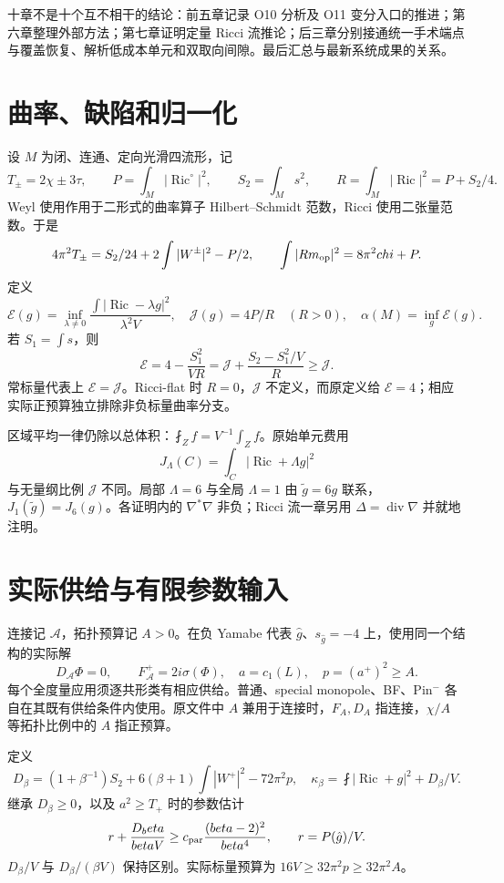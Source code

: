 \documentclass[UTF8,11pt,openany,oneside,fontset=none]{ctexbook}
\begin{document}
十章不是十个互不相干的结论：前五章记录 O10 分析及 O11 变分入口的推进；第六章整理外部方法；第七章证明定量 Ricci 流推论；后三章分别接通统一手术端点与覆盖恢复、解析低成本单元和双取向间隙。最后汇总与最新系统成果的关系。

\section{曲率、缺陷和归一化}\label{ch0:ux66f2ux7387ux7f3aux9677ux548cux5f52ux4e00ux5316}

设 \(M\) 为闭、连通、定向光滑四流形，记 \[
T_\pm=2\chi\pm3\tau,\qquad
P=\int_M|\operatorname{Ric}^{\circ}|^2,\qquad
S_2=\int_Ms^2,\qquad R=\int_M|\operatorname{Ric}|^2=P+S_2/4.
\] Weyl 使用作用于二形式的曲率算子 Hilbert--Schmidt 范数，Ricci 使用二张量范数。于是 \[
4\pi^2T_\pm=S_2/24+2\int|W^\pm|^2-P/2,
\qquad\int|\operatorname{Rm}_{\rm op}|^2=8\pi^2\chi+P.
\] 定义 \[
\mathcal E(g)=\inf_{\lambda\ne0}
\frac{\int|\operatorname{Ric}-\lambda g|^2}{\lambda^2V},
\quad\mathcal J(g)=4P/R\quad(R>0),\quad
\alpha(M)=\inf_g\mathcal E(g).
\] 若 \(S_1=\int s\)，则 \[
\mathcal E=4-\frac{S_1^2}{VR}
=\mathcal J+\frac{S_2-S_1^2/V}{R}\ge\mathcal J.
\] 常标量代表上 \(\mathcal E=\mathcal J\)。Ricci-flat 时 \(R=0\)，\(\mathcal J\) 不定义，而原定义给 \(\mathcal E=4\)；相应实际正预算独立排除非负标量曲率分支。

区域平均一律仍除以总体积：\(\fint_Z f=V^{-1}\int_Zf\)。原始单元费用 \[
J_\Lambda(C)=\int_C|\operatorname{Ric}+\Lambda g|^2
\] 与无量纲比例 \(\mathcal J\) 不同。局部 \(\Lambda=6\) 与全局 \(\Lambda=1\) 由 \(\widetilde g=6g\) 联系，\(J_1(\widetilde g)=J_6(g)\)。各证明内的 \(\nabla^*\nabla\) 非负；Ricci 流一章另用 \(\Delta=\operatorname{div}\nabla\) 并就地注明。

\section{实际供给与有限参数输入}\label{ch0:ux5b9eux9645ux4f9bux7ed9ux4e0eux6709ux9650ux53c2ux6570ux8f93ux5165}

连接记 \(\mathcal A\)，拓扑预算记 \(A>0\)。在负 Yamabe 代表 \(\hat g\)、\(s_{\hat g}=-4\) 上，使用同一个结构的实际解 \[
D_{\mathcal A}\Phi=0,\qquad F_{\mathcal A}^+=2i\sigma(\Phi),
\quad a=c_1(L),\quad p=(a^+)^2\ge A.
\] 每个全度量应用须逐共形类有相应供给。普通、special monopole、BF、Pin\(^-\) 各自在其既有供给条件内使用。原文件中 \(A\) 兼用于连接时，\(F_A,D_A\) 指连接，\(\chi/A\) 等拓扑比例中的 \(A\) 指正预算。\cite{Base,N1}

定义 \[
D_\beta=(1+\beta^{-1})S_2+6(\beta+1)\int|W^+|^2-72\pi^2p,
\quad\kappa_\beta=\fint|\operatorname{Ric}+g|^2+D_\beta/V.
\] 继承 \(D_\beta\ge0\)，以及 \(a^2\ge T_+\) 时的参数估计 \[
r+\frac{D_\beta}{\beta V}\ge c_{\rm par}
\frac{(\beta-2)^2}{\beta^4},\qquad r=P(\hat g)/V.
\] \(D_\beta/V\) 与 \(D_\beta/(\beta V)\) 保持区别。实际标量预算为 \(16V\ge32\pi^2p\ge32\pi^2A\)。
\end{document}
